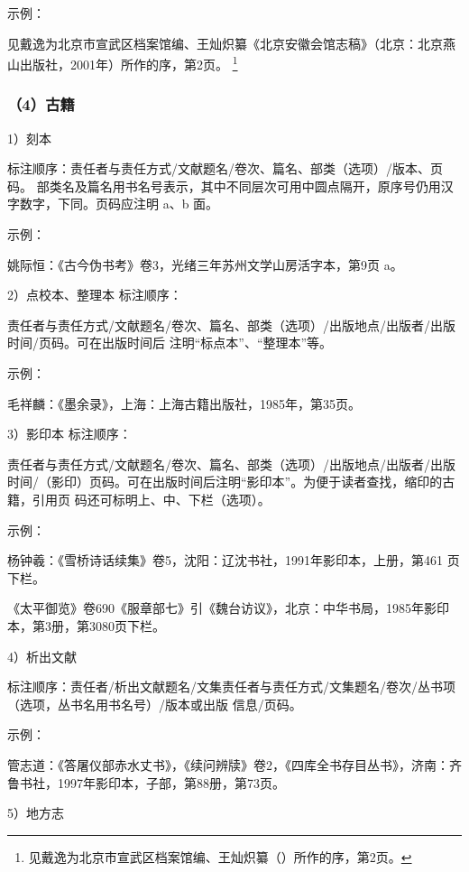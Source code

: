 \documentclass{article}
\begin{document}
示例：

见戴逸为北京市宣武区档案馆编、王灿炽纂《北京安徽会馆志稿》（北京：北京燕山出版社，2001年）所作的序，第2页。
\footnote{见戴逸为北京市宣武区档案馆编、王灿炽纂（）所作的序，第2页。}


\subsubsection*{（4）古籍}

1）刻本

标注顺序：责任者与责任方式/文献题名/卷次、篇名、部类（选项）/版本、页码。 部类名及篇名用书名号表示，其中不同层次可用中圆点隔开，原序号仍用汉字数字，下同。页码应注明 a、b 面。

示例：

姚际恒：《古今伪书考》卷3，光绪三年苏州文学山房活字本，第9页 a。

2）点校本、整理本 标注顺序：

责任者与责任方式/文献题名/卷次、篇名、部类（选项）/出版地点/出版者/出版时间/页码。可在出版时间后 注明“标点本”、“整理本”等。

示例：

毛祥麟：《墨余录》，上海：上海古籍出版社，1985年，第35页。

3）影印本 标注顺序：

责任者与责任方式/文献题名/卷次、篇名、部类（选项）/出版地点/出版者/出版时间/（影印）页码。可在出版时间后注明“影印本”。为便于读者查找，缩印的古籍，引用页 码还可标明上、中、下栏（选项）。

示例：

杨钟羲：《雪桥诗话续集》卷5，沈阳：辽沈书社，1991年影印本，上册，第461 页下栏。

《太平御览》卷690《服章部七》引《魏台访议》，北京：中华书局，1985年影印本，第3册，第3080页下栏。

4）析出文献

标注顺序：责任者/析出文献题名/文集责任者与责任方式/文集题名/卷次/丛书项（选项，丛书名用书名号）/版本或出版 信息/页码。

示例：

管志道：《答屠仪部赤水丈书》，《续问辨牍》卷2，《四库全书存目丛书》，济南：齐鲁书社，1997年影印本，子部，第88册，第73页。

5）地方志
\end{document}
